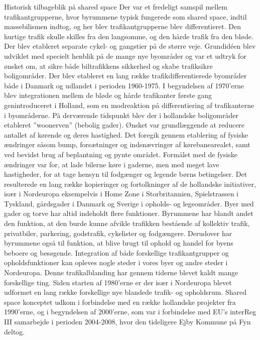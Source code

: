 Historisk tilbageblik på shared space
Der var et fredeligt samspil mellem trafikantgrupperne, hvor byrummene typisk fungerede som shared space, indtil massebilismen indtog, og her blev trafikantgrupperne blev differentieret. Den hurtige trafik skulle skilles fra den langsomme, og den hårde trafik fra den bløde. Der blev etableret separate cykel- og gangstier på de større veje. Grundidéen blev udviklet med specielt henblik på de mange nye byområder og var et udtryk for ønsket om, at sikre både biltrafikkens sikkerhed og skabe trafiksikre boligområder. Der blev etableret en lang række trafikdifferentierede byområder både i Danmark og udlandet i perioden 1960-1975.
I begyndelsen af 1970’erne blev integrationen mellem de bløde og hårde trafikanter første gang genintroduceret i Holland, som en modreaktion på differentiering af trafikanterne i byområderne. På derværende tidspunkt blev der i hollandske boligområder etableret ”woonerven” (bebolig gader). Ønsket var grundlæggende at reducere antallet af kørende og deres hastighed. Det foregik gennem etablering af fysiske ændringer såsom bump, forsætninger og indsnævringer af kørebanearealet, samt ved bevidst brug af beplantning og pynte området. Formålet med de fysiske ændringer var for, at lade bilerne køre i gaderne, men med meget lave hastigheder, for at tage hensyn til fodgænger og legende børns betingelser.  Det resulterede en lang række kopieringer og fortolkninger af de hollandske initiativer, især i Nordeuropa eksempelvis i Home Zone i Storbritannien, Spielstrassen i Tyskland, gårdsgader i Danmark og Sverige i opholds- og legeområder.
Byer med gader og torve har altid indeholdt flere funktioner.  Byrummene har blandt andet den funktion, at den burde kunne afvikle trafikken bestående af kollektiv trafik, privatbiler, parkering, godstrafik, cykelister og fodgængere. Derudover har byrummene også til funktion, at blive brugt til ophold og handel for byens beboere og besøgende.
Integration af både forskellige trafikantgrupper og opholdsfunktioner kan opleves nogle steder i vores byer og andre steder i Nordeuropa. Denne trafikalblanding har gennem tiderne blevet kaldt mange forskellige ting. Siden starten af 1980’erne er der især i Nordeuropa blevet udformet en lang række forskellige nye blandede trafik- og opholdsrum.
Shared space konceptet udkom i forbindelse med en række hollandske projekter fra 1990’erne, og i begyndelsen af 2000’erne, som var i forbindelse med EU’s interReg III samarbejde i perioden 2004-2008, hvor den tideligere Ejby Kommune på Fyn deltog.

